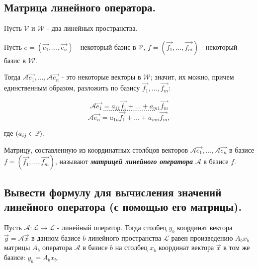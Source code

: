 \newpage


\subsection{
    Матрица линейного оператора.
}

Пусть $\mathcal{V}$ и $\mathcal{W}$ - два линейных пространства.

Пусть $e = (\vec{e_1}, \ldots, \vec{e_n})$ - некоторый базис в $\mathcal{V}$, $f = (\vec{f_1}, \ldots, \vec{f_m})$ - некоторый базис в $\mathcal{W}$. 

Тогда $\mathscr{A}\vec{e_1}, \ldots, \mathscr{A}\vec{e_n}$ - это некоторые векторы в $\mathcal{W}$; значит, их можно, причем единственным образом, разложить по базису $\vec{f_1}, \ldots, \vec{f_m}$:

$$\mathscr{A}\vec{e_1} = a_{11}\vec{f_1} + \ldots + a_{m1}\vec{f_m}$$
$$\ldots \ldots \ldots \ldots \ldots \ldots \ldots \ldots \ldots$$
$$\mathscr{A}\vec{e_n} = a_{1n}\vec{f_1} + \ldots + a_{mn}\vec{f_m},$$

где $(a_{ij} \in \mathbb{P})$.

\begin{definition}
    Матрицу, составленную из координатных столбцов векторов $\mathscr{A}\vec{e_1}, \ldots, \mathscr{A}\vec{e_n}$ в базисе $f = (\vec{f_1}, \ldots, \vec{f_m})$, называют \textit{\textbf{матрицей линейного оператора}} $\mathscr{A}$ в базисе $f$.
\end{definition}


\newpage


\subsection{
    Вывести формулу для вычисления значений 
    линейного оператора (с помощью его 
    матрицы).
}

\begin{theorem}
    Пусть $\mathscr{A} \colon \mathcal{L} \to \mathcal{L}$ - линейный оператор. Тогда столбец $y_b$ координат вектора $\vec{y} = \mathscr{A}\vec{x}$ в данном базисе $b$ линейного пространства $\mathcal{L}$ равен произведению $A_bx_b$ матрицы $A_b$ оператора $\mathscr{A}$ в базисе $b$ на столбец $x_b$ координат вектора $\vec{x}$ в том же базисе: $y_b = A_bx_b$.
    \label{thm:theorem_21_1}
\end{theorem}

